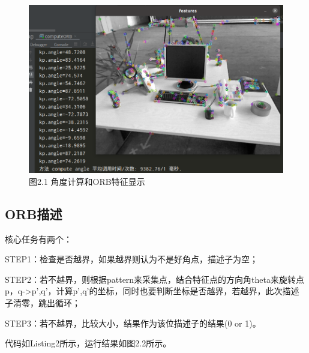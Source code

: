 \documentclass[40pt,a4paper，UTF8]{ctexart}
\numberwithin{equation}{section}
\begin{document}
\begin{figure}[H]
\centering
\includegraphics[width=4.8in]{ch5_2_1.png} {图2.1 角度计算和ORB特征显示}
\end{figure}

\subsection{ORB描述}
核心任务有两个：

STEP1：检查是否越界，如果越界则认为不是好角点，描述子为空；

STEP2：若不越界，则根据pattern来采集点，结合特征点的方向角theta来旋转点p，q->p',q'，计算p',q'的坐标，同时也要判断坐标是否越界，若越界，此次描述子清零，跳出循环；

STEP3：若不越界，比较大小，结果作为该位描述子的结果(0 or 1)。

代码如Listing2所示，运行结果如图2.2所示。
\end{document}

